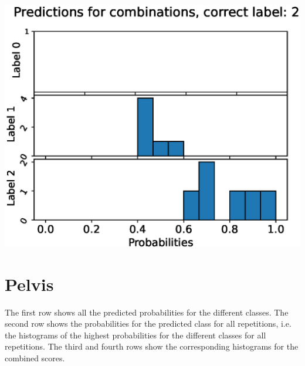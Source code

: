 \begin{center}
\begin{minipage}{0.33\textwidth}
  \includegraphics[width=\textwidth]{files/figs/app/hists/trunk/pc2.eps}
\end{minipage}
\end{center}

\newpage
\section{Pelvis}
The first row shows all the predicted probabilities for the different classes. The second row shows the probabilities for the predicted class for all repetitions, i.e. the histograms of the highest probabilities for the different classes for all repetitions. The third and fourth rows show the corresponding histograms for the combined scores.


